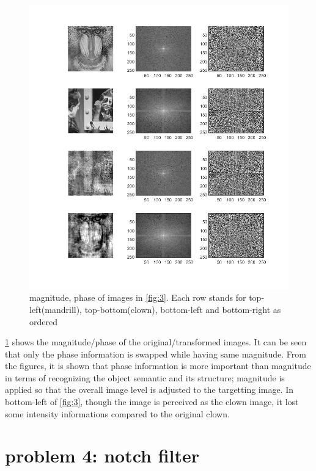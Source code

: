 \documentclass[extendedabs]{bmvc2k}
\begin{document}
\begin{figure}[h]
    \centering
    \includegraphics[width=\linewidth]{hw3_3_2}
    \caption{magnitude, phase of images in \figurename{\ref{fig:3}}. Each row stands for
    top-left(mandrill), top-bottom(clown), bottom-left and bottom-right as ordered}
    \label{fig:4}
\end{figure}

\figurename{\ref{fig:4}} shows the magnitude/phase of the original/transformed images. It can
be seen that only the phase information is swapped while having same magnitude.
From the figures, it is shown that phase information is more important than magnitude in terms
of recognizing the object semantic and its structure; magnitude is applied so that the overall
image level is adjusted to the targetting image. In bottom-left of \figurename{\ref{fig:3}},
though the image is perceived as the clown image, it lost some intensity informations compared
to the original clown. 

\section*{problem 4: notch filter}
\end{document}
